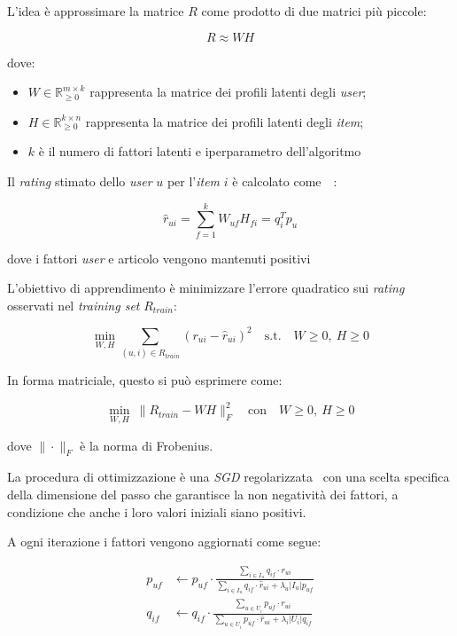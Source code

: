 L'idea è approssimare la matrice $R$ come prodotto di due matrici più piccole:

\[
R \approx WH
\]

dove:
\begin{itemize}
    \item $W \in \mathbb{R}_{\geq 0}^{m \times k}$ rappresenta la matrice dei profili latenti degli \textit{user};
    \item $H \in \mathbb{R}_{\geq 0}^{k \times n}$ rappresenta la matrice dei profili latenti degli \textit{item};
    \item $k$ è il numero di fattori latenti e iperparametro dell'algoritmo
\end{itemize}

Il \textit{rating} stimato dello \textit{user} $u$ per l'\textit{item} $i$ è calcolato come~\cite{NMF2}~\cite{NMF3}:

\[
\hat{r}_{ui} = \sum_{f=1}^k W_{uf} H_{fi} = q_i^T p_u
\]

dove i fattori \textit{user} e articolo vengono mantenuti positivi

L'obiettivo di apprendimento è minimizzare l'errore quadratico sui \textit{rating} osservati nel \textit{training set} $R_{train}$:

\[
\min_{W, H} \sum_{(u,i) \in R_{train}} \left( r_{ui} - \hat{r}_{ui} \right)^2 \quad \text{s.t.} \quad W \geq 0,\ H \geq 0
\]

In forma matriciale, questo si può esprimere come:

\[
\min_{W, H} \ \| R_{train} - WH \|_F^2 \quad \text{con} \quad W \geq 0,\ H \geq 0
\]

dove $\| \cdot \|_F$ è la norma di Frobenius.

La procedura di ottimizzazione è una \textit{SGD} regolarizzata~\cite{NMF} con una scelta specifica della dimensione del passo che garantisce la non negatività dei fattori, a condizione che anche i loro valori iniziali siano positivi.

A ogni iterazione i fattori vengono aggiornati come segue:

\begin{equation}
    \begin{split}
        p_{uf} &\leftarrow p_{uf} \cdot \frac{\sum\limits_{i \in I_u} q_{if} \cdot r_{ui}}{\sum\limits_{i \in I_u} q_{if} \cdot \hat{r}_{ui} + \lambda_u |I_u| p_{uf}}\\
        q_{if} &\leftarrow q_{if} \cdot \frac{\sum\limits_{u \in U_i} p_{uf} \cdot r_{ui}}{\sum\limits_{u \in U_i} p_{uf} \cdot \hat{r}_{ui} + \lambda_i |U_i| q_{if}}
    \end{split}
\end{equation}

